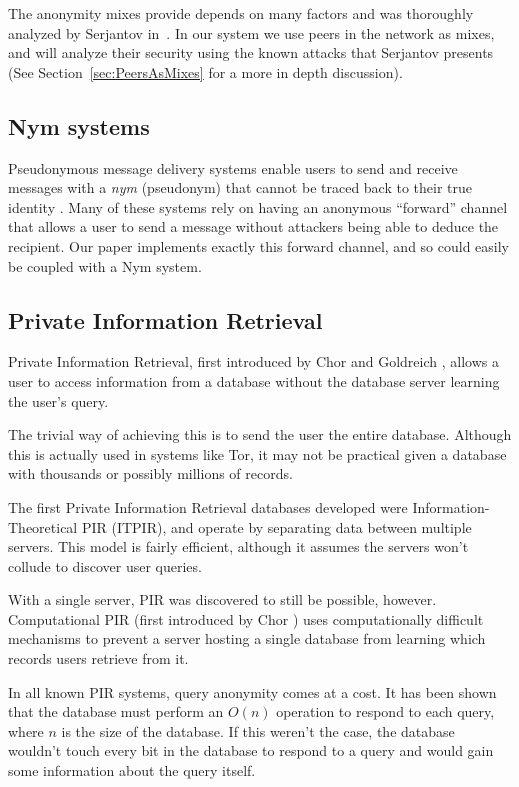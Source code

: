 \documentclass[twocolumn,11pt,english]{article}
\begin{document}
The anonymity mixes provide depends on many factors and was thoroughly analyzed by Serjantov in~\cite{trickle02}. In our system we use peers in the network as mixes, and will analyze their security using the known attacks that Serjantov presents (See Section~\ref{sec:PeersAsMixes} for a more in depth discussion). 

\subsection{Nym systems} Pseudonymous message delivery systems enable users to send and receive messages with a \textit{nym} (pseudonym) that cannot be traced back to their true identity \cite{sassaman:wpes2005}. Many of these systems rely on having an anonymous ``forward'' channel that allows a user to send a message without attackers being able to deduce the recipient. Our paper implements exactly this forward channel, and so could easily be coupled with a Nym system. 

\subsection{Private Information Retrieval} 

Private Information Retrieval, first introduced by Chor and Goldreich \cite{pir}, allows a user to access information from a database without the database server learning the user's query. 

The trivial way of achieving this is to send the user the entire database. Although this is actually used in systems like Tor\cite{tor-design}, it may not be practical given a database with thousands or possibly millions of records.

The first Private Information Retrieval databases developed were  Information-Theoretical PIR (ITPIR), and operate by separating data between multiple servers\cite{pir}. This model is fairly efficient, although it assumes the servers won't collude to discover user queries. 

With a single server, PIR was discovered to still be possible, however. Computational PIR (first introduced by Chor \cite{CPIR}) uses computationally difficult mechanisms to prevent a server hosting a single database from learning which records users retrieve from it. 

In all known PIR systems, query anonymity comes at a cost. It has been shown that the database must perform an $O(n)$ operation to respond to each query\cite{CPIR}, where $n$ is the size of the database. If this weren't the case, the database wouldn't touch every bit in the database to respond to a query and would gain some information about the query itself. 
\end{document}
